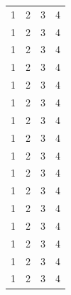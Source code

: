\documentclass{article}
\begin{document}
\begin{longtable}{|c|c|c|c|}
    1 & 2 & 3 & 4 \\ 1 & 2 & 3 & 4 \\ 1 & 2 & 3 & 4 \\ 1 & 2 & 3 & 4 \\
    1 & 2 & 3 & 4 \\ 1 & 2 & 3 & 4 \\ 1 & 2 & 3 & 4 \\ 1 & 2 & 3 & 4 \\
    1 & 2 & 3 & 4 \\ 1 & 2 & 3 & 4 \\ 1 & 2 & 3 & 4 \\ 1 & 2 & 3 & 4 \\
    1 & 2 & 3 & 4 \\ 1 & 2 & 3 & 4 \\ 1 & 2 & 3 & 4 \\ 1 & 2 & 3 & 4 \\
\end{longtable}
\end{document}
